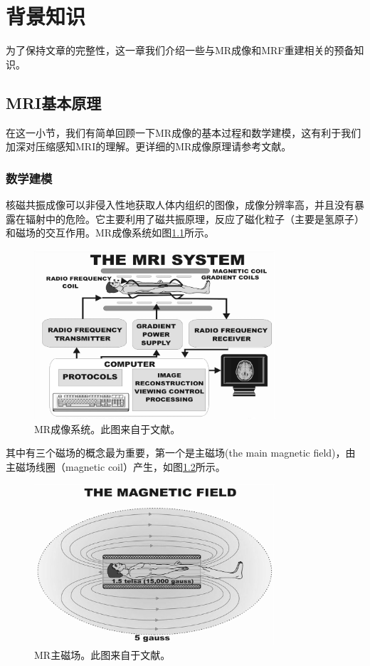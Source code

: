 \chapter{背景知识}
\label{chap:pre}
为了保持文章的完整性，这一章我们介绍一些与MR成像和MRF重建相关的预备知识。

\section{MRI基本原理}
\label{sec:mr}
在这一小节，我们有简单回顾一下MR成像的基本过程和数学建模，这有利于我们加深对压缩感知MRI的理解。更详细的MR成像原理请参考文献\cite{mrireview,2009nmr,haacke1999magnetic}。

\subsection{数学建模}
\label{sec:mrimodel}
核磁共振成像可以非侵入性地获取人体内组织的图像，成像分辨率高，并且没有暴露在辐射中的危险。它主要利用了磁共振原理，反应了磁化粒子（主要是氢原子）和磁场的交互作用。MR成像系统如图\ref{fig:system}所示。
\begin{figure}[htbp]
\centering
\includegraphics[width=0.8\textwidth]{img/intro/system.eps}
\caption{MR成像系统。此图来自于文献\cite{sprawls2000magnetic}。}
\label{fig:system}
\end{figure}
其中有三个磁场的概念最为重要，第一个是主磁场(the main magnetic field)，由主磁场线圈（magnetic coil）产生，如图\ref{fig:main}所示。
\begin{figure}[htbp]
\centering
\includegraphics[width=0.8\textwidth]{img/intro/main.eps}
\caption{MR主磁场。此图来自于文献\cite{sprawls2000magnetic}。}
\label{fig:main}
\end{figure}

